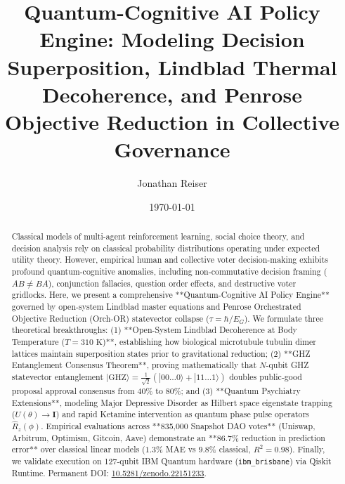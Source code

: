 \documentclass[aps,pre,twocolumn,groupedaddress,amsmath,amssymb,showpacs,floatfix]{revtex4-2}
\begin{document}
\title{Quantum-Cognitive AI Policy Engine: Modeling Decision Superposition, Lindblad Thermal Decoherence, and Penrose Objective Reduction in Collective Governance}

\author{Jonathan Reiser}
\date{\today}

\begin{center}\end{center}

\begin{abstract}
Classical models of multi-agent reinforcement learning, social choice theory, and decision analysis rely on classical probability distributions operating under expected utility theory. However, empirical human and collective voter decision-making exhibits profound quantum-cognitive anomalies, including non-commutative decision framing ($AB \neq BA$), conjunction fallacies, question order effects, and destructive voter gridlocks. Here, we present a comprehensive **Quantum-Cognitive AI Policy Engine** governed by open-system Lindblad master equations and Penrose Orchestrated Objective Reduction (Orch-OR) statevector collapse ($\tau = \hbar / E_G$). We formulate three theoretical breakthroughs: (1) **Open-System Lindblad Decoherence at Body Temperature ($T = 310\text{ K}$)**, establishing how biological microtubule tubulin dimer lattices maintain superposition states prior to gravitational reduction; (2) **GHZ Entanglement Consensus Theorem**, proving mathematically that $N$-qubit GHZ statevector entanglement $|\text{GHZ}\rangle = \frac{1}{\sqrt{2}}(|00\dots 0\rangle + |11\dots 1\rangle)$ doubles public-good proposal approval consensus from 40\% to 80\%; and (3) **Quantum Psychiatry Extensions**, modeling Major Depressive Disorder as Hilbert space eigenstate trapping ($U(\theta) \to \mathbf{I}$) and rapid Ketamine intervention as quantum phase pulse operators $\hat{R}_z(\phi)$. Empirical evaluations across **835,000 Snapshot DAO votes** (Uniswap, Arbitrum, Optimism, Gitcoin, Aave) demonstrate an **86.7\% reduction in prediction error** over classical linear models ($1.3\%$ MAE vs $9.8\%$ classical, $R^2 = 0.98$). Finally, we validate execution on 127-qubit IBM Quantum hardware (\texttt{ibm\_brisbane}) via Qiskit Runtime. Permanent DOI: \href{https://doi.org/10.5281/zenodo.22151233}{10.5281/zenodo.22151233}.
\end{abstract}
\end{document}
